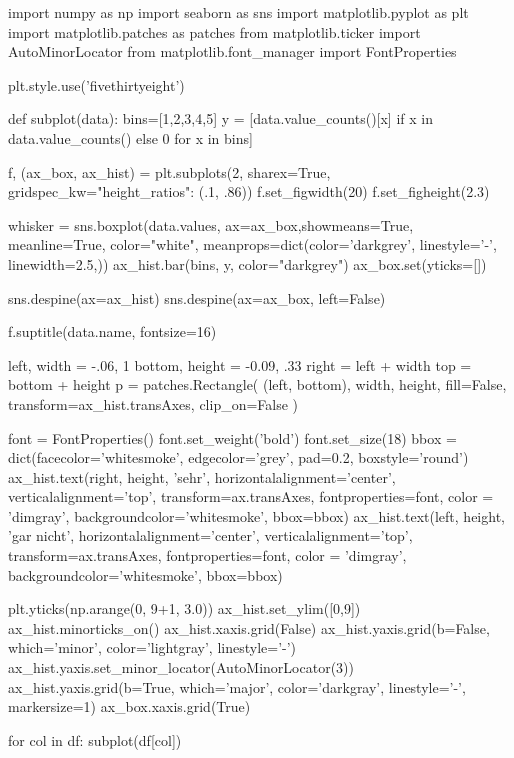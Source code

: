 \begin{python}
import numpy as np
import seaborn as sns
import matplotlib.pyplot as plt
import matplotlib.patches as patches
from matplotlib.ticker import AutoMinorLocator
from matplotlib.font_manager import FontProperties

plt.style.use('fivethirtyeight')

def subplot(data):
    bins=[1,2,3,4,5]
    y = [data.value_counts()[x] if x in data.value_counts() else 0 for x in bins]

    f, (ax_box, ax_hist) = plt.subplots(2, sharex=True, gridspec_kw={"height_ratios": (.1, .86)})
    f.set_figwidth(20)
    f.set_figheight(2.3)

    whisker = sns.boxplot(data.values, 
                          ax=ax_box,showmeans=True, 
                          meanline=True, color="white", 
                          meanprops=dict(color='darkgrey', linestyle='-', linewidth=2.5,))
    ax_hist.bar(bins, y, color="darkgrey")
    ax_box.set(yticks=[])

    sns.despine(ax=ax_hist)
    sns.despine(ax=ax_box, left=False)

    f.suptitle(data.name, fontsize=16)   
    
    left, width = -.06, 1
    bottom, height = -0.09, .33
    right = left + width
    top = bottom + height
    p = patches.Rectangle(
        (left, bottom), width, height,
        fill=False, transform=ax_hist.transAxes, clip_on=False
    )
      
    font = FontProperties()
    font.set_weight('bold')
    font.set_size(18)  
    bbox = dict(facecolor='whitesmoke', edgecolor='grey', pad=0.2, boxstyle='round')
    ax_hist.text(right, height, 'sehr',
        horizontalalignment='center',
        verticalalignment='top',
        transform=ax.transAxes,
        fontproperties=font,
        color = 'dimgray',
        backgroundcolor='whitesmoke', 
        bbox=bbox)
    ax_hist.text(left, height, 'gar nicht',
        horizontalalignment='center',
        verticalalignment='top',
        transform=ax.transAxes,
        fontproperties=font,
        color = 'dimgray',
        backgroundcolor='whitesmoke', 
        bbox=bbox)
    
    plt.yticks(np.arange(0, 9+1, 3.0))
    ax_hist.set_ylim([0,9])
    ax_hist.minorticks_on()
    ax_hist.xaxis.grid(False)
    ax_hist.yaxis.grid(b=False, which='minor', color='lightgray', linestyle='-')
    ax_hist.yaxis.set_minor_locator(AutoMinorLocator(3))
    ax_hist.yaxis.grid(b=True, which='major', color='darkgray', linestyle='-', markersize=1)
    ax_box.xaxis.grid(True)    

for col in df:
    subplot(df[col])
\end{python}

